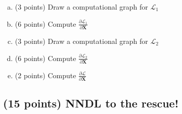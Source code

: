 \documentclass{article}
\begin{document}
\begin{enumerate}[(a)]
    \item (3 points) Draw a computational graph for $\mathcal{L}_1$
    
    \begin{shaded}
    
    \end{shaded}
    
    \item (6 points) Compute $\frac{\partial \mathcal{L}_1}{\partial \mathbf{X}}$
    
    \begin{shaded}
    \end{shaded}
    
    \item (3 points) Draw a computational graph for $\mathcal{L}_2$
    
    \begin{shaded}

    \end{shaded}
    
    \item (6 points) Compute $\frac{\partial \mathcal{L}_2}{\partial \mathbf{X}}$
    
    \begin{shaded}
    \end{shaded}
    
    \item (2 points) Compute $\frac{\partial \mathcal{L}}{\partial \mathbf{X}}$
    \begin{shaded}
    \end{shaded}

\end{enumerate}


\pagebreak 


\subsection*{(15 points) NNDL to the rescue! \newline}
\end{document}
